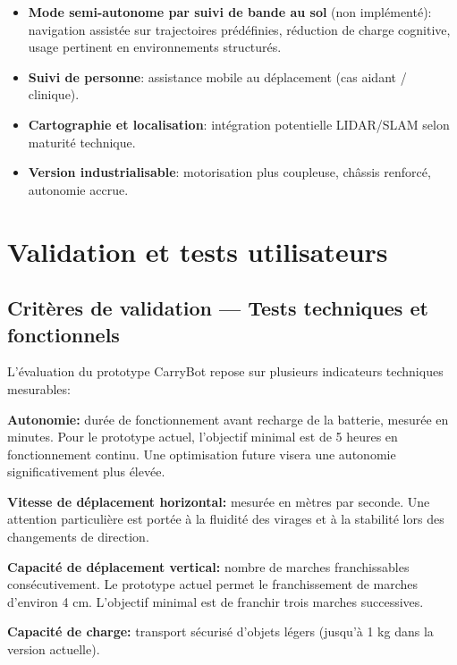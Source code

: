 \documentclass[12pt,a4paper]{article}
\begin{document}
\begin{itemize}
    \item \textbf{Mode semi-autonome par suivi de bande au sol} (non implémenté):
    navigation assistée sur trajectoires prédéfinies, réduction de charge cognitive, usage pertinent en environnements structurés.

    \item \textbf{Suivi de personne}:
    assistance mobile au déplacement (cas aidant / clinique).

    \item \textbf{Cartographie et localisation}:
    intégration potentielle LIDAR/SLAM selon maturité technique.

    \item \textbf{Version industrialisable}:
    motorisation plus coupleuse, châssis renforcé, autonomie accrue.
\end{itemize}

\section{Validation et tests utilisateurs}

\subsection{Critères de validation — Tests techniques et fonctionnels}

L’évaluation du prototype CarryBot repose sur plusieurs indicateurs techniques mesurables:

\textbf{Autonomie:} durée de fonctionnement avant recharge de la batterie, mesurée en minutes. Pour le prototype actuel, l’objectif minimal est de 5 heures en fonctionnement continu. Une optimisation future visera une autonomie significativement plus élevée.

\textbf{Vitesse de déplacement horizontal:} mesurée en mètres par seconde. Une attention particulière est portée à la fluidité des virages et à la stabilité lors des changements de direction.

\textbf{Capacité de déplacement vertical:} nombre de marches franchissables consécutivement. Le prototype actuel permet le franchissement de marches d’environ 4 cm. L’objectif minimal est de franchir trois marches successives.

\textbf{Capacité de charge:} transport sécurisé d’objets légers (jusqu’à 1 kg dans la version actuelle).
\end{document}
